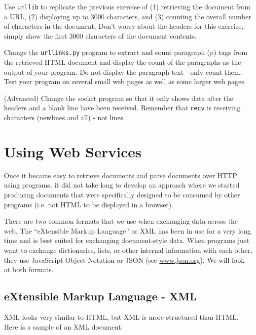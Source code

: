 \documentclass[11pt]{book}
\begin{document}
\begin{ex}
Use {\tt urllib} to replicate the previous exercise of (1) retrieving the document
from a URL, (2) displaying up to 3000 characters, and (3) counting the overall number
of characters in the document.  Don't worry about the headers for this exercise, simply
show the first 3000 characters of the document contents.
\end{ex}

\begin{ex}
Change the {\tt urllinks.py} program to extract and count 
paragraph (p) tags from the retrieved HTML document and 
display the count of the paragraphs as the 
output of your program.  
Do not display the paragraph text - only count them.
Test your program on several small web pages
as well as some larger web pages.
\end{ex}

\begin{ex}
(Advanced) Change the socket program so that it only shows data after the 
headers and a blank line have been received.  Remember that {\tt recv} is
receiving characters (newlines and all) - not lines.
\end{ex}


\chapter{Using Web Services}

Once it became easy to retrieve documents and parse documents 
over HTTP using programs, it did not take long to develop 
an approach where we started producing documents that were specifically
designed to be consumed by other 
programs (i.e. not HTML to be displayed in a browser).

There are two common formats that we use when exchanging data across the web.
The ``eXtensible Markup Language'' or XML has been in use for a very long time 
and is best suited for exchanging document-style data.   When programs just want 
to exchange dictionaries, lists, or other internal information with each other,
they use JavaScript Object Notation or JSON (see \url{www.json.org}).  
We will look at both formats.

\section{eXtensible Markup Language - XML}

XML looks very similar to HTML, but XML is more structured 
than HTML.  Here is a sample of an XML document:
\end{document}
